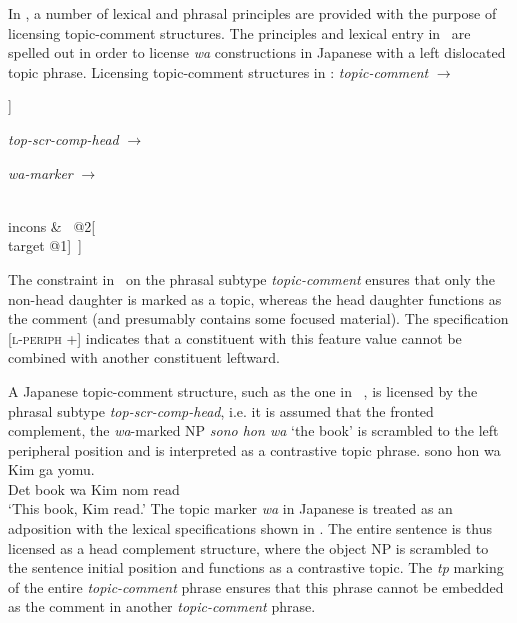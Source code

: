 \documentclass[output=paper]{langsci/langscibook}
\begin{document}
In \cite{song2018}, a number of lexical and phrasal principles are
provided with the purpose of licensing topic-comment structures. The
principles and lexical entry in~ are spelled out
in order to license \emph{wa} constructions in Japanese with a left
dislocated topic phrase.
\ea
\label{ex:song-topic}
Licensing topic-comment structures in \cite{song2018}:
\ea
\label{ex:song-topic-a}
\textit{topic-comment}
$\rightarrow$
\begin{avm}
  [l-periph & $+$\\
  mkg & tp\\
  hd|mkg|tp & $-$\\
  nhd & [mkg & tp\\l-periph & $+$]]
  \end{avm}
  \ex
  \label{ex:song-topic-b}
  \textit{top-scr-comp-head}
  $\rightarrow$
  \begin{avm}
  \end{avm}
  \ex
  \label{ex:song-topic-c}
  \textit{wa-marker}
  $\rightarrow$
  \begin{avm}
    [stem & \<\normalfont{\textit{wa}}\>\\
    incons-key & @2\\
    mkg & tp\\
    comps & \<[index @1]\>\\
    incons & \<\normalfont{!}\ @2[\\target @1]\ \normalfont{!}\>]
  \end{avm}
\z
\z
The constraint in~ on the phrasal subtype
\textit{topic-comment} ensures that only the non-head daughter is
marked as a topic, whereas the head daughter functions as the comment
(and presumably contains some focused material). The specification
[\textsc{l-periph} +] indicates that a constituent with this feature
value cannot be combined with another constituent leftward.

A Japanese topic-comment structure, such as the one
in~ \citep[198]{song2018}, is licensed by the phrasal
subtype \textit{top-scr-comp-head}, i.e. it is assumed that the
fronted complement, the \emph{wa}-marked NP \textit{sono hon wa} `the book'
is scrambled to the left peripheral position and is interpreted as a
contrastive topic phrase.
\ea
\label{ex:song-wa}
\gll sono hon wa Kim ga yomu.\\
Det book wa Kim nom read \\
\trans `This book, Kim read.'
\z
The topic marker \emph{wa} in Japanese is treated as an adposition with the
lexical specifications shown in . The entire
sentence is thus licensed as a head complement structure, where the
object NP is scrambled to the sentence initial position and functions
as a contrastive topic. The \textit{tp} marking of the entire
\textit{topic-comment} phrase ensures that this phrase cannot be
embedded as the comment in another \textit{topic-comment} phrase.
\end{document}

